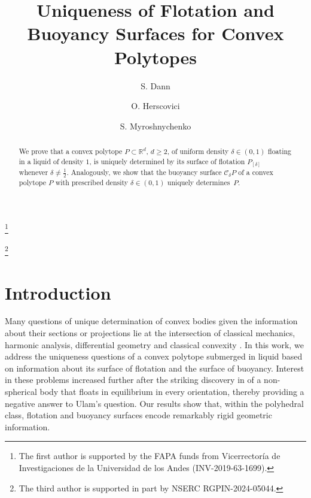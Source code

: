 \documentclass[12pt,letterpaper,reqno]{amsart}
\begin{document}
\author{S. Dann}
\thanks{The first author is supported by the FAPA funds from Vicerrectoría de Investigaciones de la Universidad de los Andes (INV-2019-63-1699).}

\author{O. Herscovici}

\author{S. Myroshnychenko}
\thanks{The third author is supported in part by NSERC RGPIN-2024-05044.}

\address{S. Dann, Departamento de Matemáticas, Universidad de los Andes, Carrera 1 \#18A -- 12
Bogota, 111711, Colombia}

\address{O. Herscovici, Department of Mathematics and Computer Science, St. John's University, 8000
Utopia Parkway, Queens, NY 11439, USA}

\address{S.~Myroshnychenko, Department of Mathematics and Statistics,  University of the Fraser Valley, 33844 King Rd, Abbotsford, BC V2S 7M7,  Canada}



\title[Uniqueness of Flotation and Buoyancy Surfaces for Convex Polytopes]{Uniqueness of Flotation and Buoyancy Surfaces for Convex Polytopes}
\maketitle



\begin{abstract}
We prove that a convex polytope \(P \subset \mathbb{R}^d\), \(d \ge 2\), of uniform density \(\delta \in (0,1)\) floating in a liquid of density \(1\), is uniquely determined by its surface of flotation \(P_{[\delta]}\) whenever \(\delta \neq \tfrac{1}{2}\). Analogously, we show that the buoyancy surface \(\mathcal{C}_\delta P\) of a convex polytope \(P\) with prescribed density \(\delta \in (0,1)\) uniquely determines~\(P\).
\end{abstract}



\section{Introduction}

Many questions of unique determination of convex bodies given the information about their sections or projections lie at the intersection of classical mechanics, harmonic analysis, differential geometry and classical convexity \cite{ARSY1,ARSY2,BMO,HSW,O,R23}. In this work,  we address the uniqueness questions of a convex polytope submerged in liquid based on information about its surface of flotation and the surface of buoyancy. 
Interest in these problems increased further after the striking discovery in \cite{R22} of a non-spherical body that floats in equilibrium in every orientation, thereby providing a negative answer to Ulam's question. Our results show that, within the polyhedral class, flotation and buoyancy surfaces encode remarkably rigid geometric information.
\end{document}
